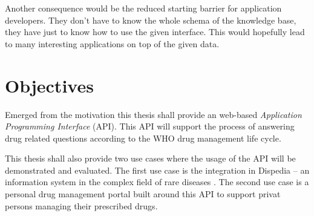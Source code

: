 Another consequence would be the reduced starting barrier for application developers.
They don't have to know the whole schema of the knowledge base, they have just to know how to use the given interface.
This would hopefully lead to many interesting applications on top of the given data.


\section{Objectives}
\label{sec:objectives}

Emerged from the motivation this thesis shall provide an web-based \textit{Application Programming Interface} (API).
This API will support the process of answering drug related questions according to the WHO drug management life cycle.

This thesis shall also provide two use cases where the usage of the API will be demonstrated and evaluated.
The first use case is the integration in Dispedia -- an information system in the complex field of rare diseases \cite{elze2013dispedia}.
The second use case is a personal drug management portal built around this API to support privat persons managing their prescribed drugs.


